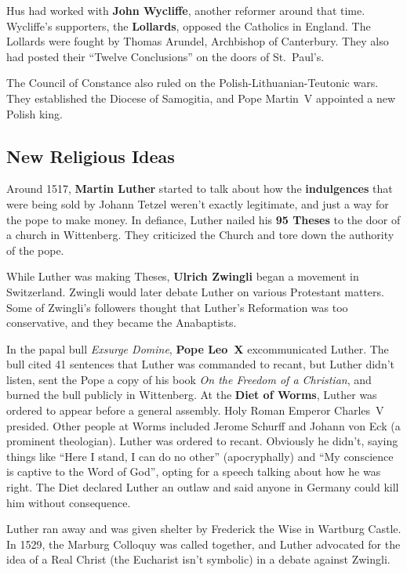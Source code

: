 Hus had worked with \textbf{John Wycliffe}, another reformer around that time.
Wycliffe's supporters, the \textbf{Lollards}, opposed the Catholics in England.
The Lollards were fought by Thomas Arundel, Archbishop of Canterbury.
They also had posted their ``Twelve Conclusions'' on the doors of St.\ Paul's.

The Council of Constance also ruled on the Polish-Lithuanian-Teutonic wars.
They established the Diocese of Samogitia, and Pope Martin~V appointed a new Polish king.

\subsection*{New Religious Ideas}

Around 1517, \textbf{Martin Luther} started to talk about how the \textbf{indulgences}
that were being sold by Johann Tetzel weren't exactly legitimate,
and just a way for the pope to make money.
In defiance, Luther nailed his \textbf{95 Theses} to the door of a church in Wittenberg.
They criticized the Church and tore down the authority of the pope.

While Luther was making Theses, \textbf{Ulrich Zwingli} began a movement in Switzerland.
Zwingli would later debate Luther on various Protestant matters.
Some of Zwingli's followers thought that Luther's Reformation was too conservative,
and they became the Anabaptists.

In the papal bull \textit{Exsurge Domine}, \textbf{Pope Leo~X} excommunicated Luther.
The bull cited 41 sentences that Luther was commanded to recant,
but Luther didn't listen, sent the Pope a copy of his book \textit{On the Freedom of a Christian},
and burned the bull publicly in Wittenberg.
At the \textbf{Diet of Worms}, Luther was ordered to appear before a general assembly.
Holy Roman Emperor Charles~V presided.
Other people at Worms included Jerome Schurff and Johann von Eck (a prominent theologian).
Luther was ordered to recant.
Obviously he didn't, saying things like
``Here I stand, I can do no other'' (apocryphally) and
``My conscience is captive to the Word of God'',
opting for a speech talking about how he was right.
The Diet declared Luther an outlaw and said anyone in Germany could kill him without consequence.

Luther ran away and was given shelter by Frederick the Wise in Wartburg Castle.
In 1529, the Marburg Colloquy was called together,
and Luther advocated for the idea of a Real Christ (the Eucharist isn't symbolic)
in a debate against Zwingli.

